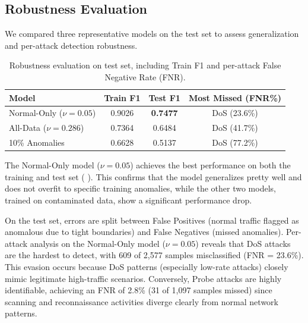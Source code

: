 \subsection{Robustness Evaluation} \label{sec:robustness}

    We compared three representative models on the test set to assess generalization and per-attack detection robustness.

    \vspace{-0.2cm}

    \begin{table}[H]
        \centering
        \begin{tabular}{@{}lccc@{}}
            \toprule
            \textbf{Model} & \textbf{Train F1} & \textbf{Test F1} & \textbf{Most Missed (FNR\%)} \\
            \midrule
            Normal-Only ($\nu{ = }0.05$) & 0.9026 & \textbf{0.7477} & DoS (23.6\%) \\
            All-Data ($\nu{ = }0.286$)   & 0.7364 & 0.6484          & DoS (41.7\%) \\
            10\% Anomalies               & 0.6628 & 0.5137          & DoS (77.2\%) \\
            \bottomrule
        \end{tabular}
        \vspace{0.5em}
        \caption{Robustness evaluation on test set, including Train F1 and per-attack False Negative Rate (FNR).}
        \label{tab:robustness}
    \end{table}   
    
    \vspace{-0.5cm}
    
    \noindent
    The Normal-Only model ($\nu = 0.05$) achieves the best performance on both the training and test set ( ). 
    This confirms that the model generalizes pretty well and does not overfit to specific training anomalies, while the other two models, trained on contaminated data, show a significant performance drop.

    On the test set, errors are split between False Positives (normal traffic flagged as anomalous due to tight boundaries) and False Negatives (missed anomalies).
    Per-attack analysis on the Normal-Only model ($\nu = 0.05$) reveals that DoS attacks are the hardest to detect, with 609 of 2,577 samples misclassified (FNR = 23.6\%).
    This evasion occurs because DoS patterns (especially low-rate attacks) closely mimic legitimate high-traffic scenarios.
    Conversely, Probe attacks are highly identifiable, achieving an FNR of 2.8\% (31 of 1,097 samples missed) since scanning and reconnaissance activities diverge clearly from normal network patterns.

